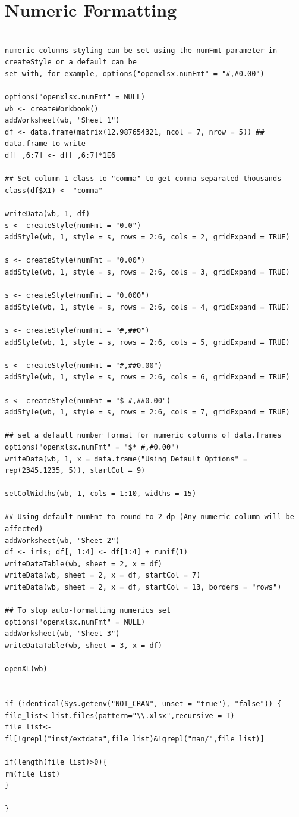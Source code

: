 \documentclass[11pt]{article}\usepackage[]{graphicx}\usepackage[]{color}
\begin{document}
\section{Numeric Formatting}
\begin{verbatim}

numeric columns styling can be set using the numFmt parameter in createStyle or a default can be 
set with, for example, options("openxlsx.numFmt" = "#,#0.00")

options("openxlsx.numFmt" = NULL)
wb <- createWorkbook()
addWorksheet(wb, "Sheet 1")
df <- data.frame(matrix(12.987654321, ncol = 7, nrow = 5)) ## data.frame to write
df[ ,6:7] <- df[ ,6:7]*1E6

## Set column 1 class to "comma" to get comma separated thousands
class(df$X1) <- "comma"

writeData(wb, 1, df)
s <- createStyle(numFmt = "0.0")
addStyle(wb, 1, style = s, rows = 2:6, cols = 2, gridExpand = TRUE)

s <- createStyle(numFmt = "0.00")
addStyle(wb, 1, style = s, rows = 2:6, cols = 3, gridExpand = TRUE)

s <- createStyle(numFmt = "0.000")
addStyle(wb, 1, style = s, rows = 2:6, cols = 4, gridExpand = TRUE)

s <- createStyle(numFmt = "#,##0")
addStyle(wb, 1, style = s, rows = 2:6, cols = 5, gridExpand = TRUE)

s <- createStyle(numFmt = "#,##0.00")
addStyle(wb, 1, style = s, rows = 2:6, cols = 6, gridExpand = TRUE)

s <- createStyle(numFmt = "$ #,##0.00")
addStyle(wb, 1, style = s, rows = 2:6, cols = 7, gridExpand = TRUE)

## set a default number format for numeric columns of data.frames
options("openxlsx.numFmt" = "$* #,#0.00")
writeData(wb, 1, x = data.frame("Using Default Options" = rep(2345.1235, 5)), startCol = 9)

setColWidths(wb, 1, cols = 1:10, widths = 15)

## Using default numFmt to round to 2 dp (Any numeric column will be affected)
addWorksheet(wb, "Sheet 2")
df <- iris; df[, 1:4] <- df[1:4] + runif(1)
writeDataTable(wb, sheet = 2, x = df)
writeData(wb, sheet = 2, x = df, startCol = 7)
writeData(wb, sheet = 2, x = df, startCol = 13, borders = "rows")

## To stop auto-formatting numerics set
options("openxlsx.numFmt" = NULL)
addWorksheet(wb, "Sheet 3")
writeDataTable(wb, sheet = 3, x = df)

openXL(wb)


if (identical(Sys.getenv("NOT_CRAN", unset = "true"), "false")) {
file_list<-list.files(pattern="\\.xlsx",recursive = T)
file_list<-fl[!grepl("inst/extdata",file_list)&!grepl("man/",file_list)]

if(length(file_list)>0){
rm(file_list)
}

}

\end{verbatim}
\end{document}
